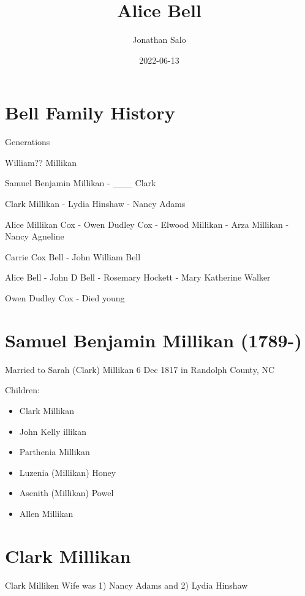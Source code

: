 \documentclass[
]{book}
\title{Alice Bell}
\author{Jonathan Salo}
\date{2022-06-13}
\providecommand{\tightlist}{%
  \setlength{\itemsep}{0pt}\setlength{\parskip}{0pt}}
\begin{document}
\maketitle

{
\setcounter{tocdepth}{1}
\tableofcontents
}
\hypertarget{bell-family-history}{%
\chapter{Bell Family History}\label{bell-family-history}}

Generations

William?? Millikan

Samuel Benjamin Millikan - \_\_\_ Clark

Clark Millikan - Lydia Hinshaw - Nancy Adams

Alice Millikan Cox - Owen Dudley Cox - Elwood Millikan - Arza Millikan - Nancy Agneline

Carrie Cox Bell - John William Bell

Alice Bell - John D Bell - Rosemary Hockett - Mary Katherine Walker

Owen Dudley Cox - Died young

\hypertarget{samuel-benjamin-millikan-1789-}{%
\chapter{Samuel Benjamin Millikan (1789-)}\label{samuel-benjamin-millikan-1789-}}

Married to Sarah (Clark) Millikan 6 Dec 1817 in Randolph County, NC

Children:

\begin{itemize}
\tightlist
\item
  Clark Millikan
\item
  John Kelly illikan
\item
  Parthenia Millikan
\item
  Luzenia (Millikan) Honey
\item
  Asenith (Millikan) Powel
\item
  Allen Millikan
\end{itemize}

\hypertarget{clark-millikan}{%
\chapter{Clark Millikan}\label{clark-millikan}}

Clark Milliken Wife was 1) Nancy Adams and 2) Lydia Hinshaw
\end{document}
